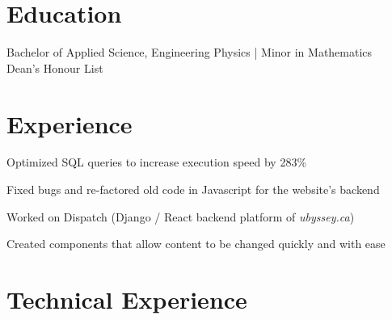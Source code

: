 \documentclass[]{deedy-resume-openfont}
\begin{document}
    
    
    
    

    \section{Education}
    Bachelor of Applied Science, Engineering Physics | Minor in Mathematics \\
    Dean's Honour List
    \sectionsep
    
    \section{Experience}
    
    \begin{tightemize}
    \item Optimized SQL queries to increase execution speed by 283\%
    \item Fixed bugs and re-factored old code in Javascript for the website’s backend
    \end{tightemize}
    \sectionsep
    
    \begin{tightemize}
    \item Worked on Dispatch (Django / React backend platform of \textit{ubyssey.ca})
    \item Created components that allow content to be changed quickly and with ease
    \end{tightemize}
    \sectionsep
    
    \section{Technical Experience}
    
\end{document}
